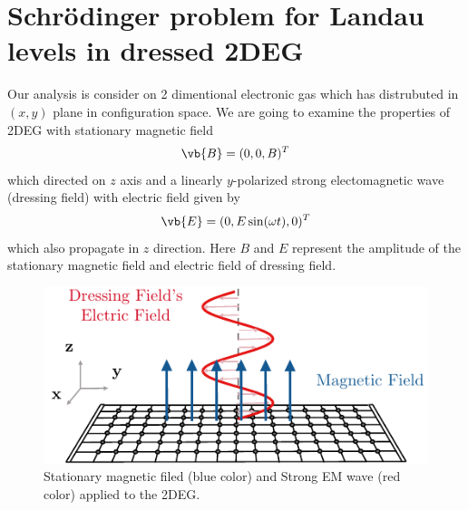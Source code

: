 \section{Schrödinger problem for Landau levels in dressed 2DEG}

Our analysis is consider on 2 dimentional electronic gas which has distrubuted in $(x,y)$ plane in configuration space. We are going to examine the properties of 2DEG with stationary magnetic field
\begin{equation} \label{1.1}
  \vb{B} = (0,0,B)^T
\end{equation}
which directed on $z$ axis and a linearly $y$-polarized strong electomagnetic wave (dressing field) with electric field given by
\begin{equation} \label{1.2}
  \vb{E} = (0,E\sin(\omega t),0)^T
\end{equation}
which also propagate in $z$ direction. Here $B$ and $E$ represent the amplitude of the stationary magnetic field and electric field of dressing field.
\begin{figure}[ht!]
  \centering
  \includegraphics[scale=0.9]{figures/fig1.pdf}
  \caption{Stationary magnetic filed (blue color) and Strong EM wave (red color) applied to the 2DEG.}
  \label{fig:1.1}
\end{figure}

